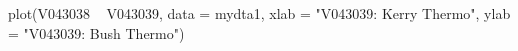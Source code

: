 \begin{Schunk}
\begin{Sinput}
 plot(V043038 ~ V043039, data = mydta1, xlab = "V043039: Kerry Thermo", ylab = "V043039: Bush Thermo")
\end{Sinput}
\end{Schunk}
